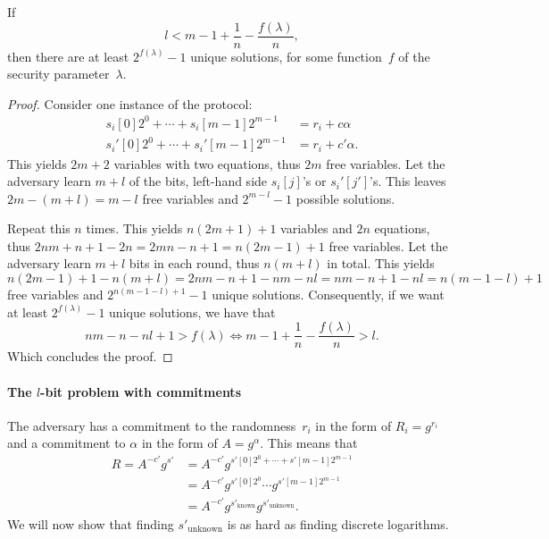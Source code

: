 \begin{lemma}\label{l-bit-advantage}
  If \[l < m-1+\frac{1}{n}-\frac{f(\lambda)}{n},\] then there are at least 
  \(2^{f(\lambda)}-1\) unique solutions, for some function~\(f\) of the 
  security parameter~\(\lambda\).
\end{lemma}
\begin{proof}
  Consider one instance of the protocol:
  \begin{align*}
    s_i[0]2^0 + \dotsb + s_i[m-1]2^{m-1} &= r_i + c\alpha \\
    s_i'[0]2^0 + \dotsb + s_i'[m-1]2^{m-1} &= r_i + c'\alpha.
  \end{align*}
  This yields \(2m+2\) variables with two equations, thus \(2m\) free variables.
  Let the adversary learn \(m+l\) of the bits, \ie left-hand side \(s_i[j]\)'s or 
  \(s_i'[j']\)'s.
  This leaves \(2m-(m+l) = m-l\) free variables and \(2^{m-l}-1\) possible 
  solutions.

  Repeat this \(n\) times.
  This yields \(n(2m+1)+1\) variables and \(2n\) equations, thus \(2nm+n+1-2n = 
  2mn - n +1 = n(2m-1)+1\) free variables.
  Let the adversary learn \(m+l\) bits in each round, thus \(n(m+l)\) in total.
  This yields \(n(2m-1)+1 -n(m+l) = 2nm-n+1-nm-nl = nm-n+1-nl = n(m-1-l)+1\) 
  free variables and \(2^{n(m-1-l)+1}-1\) unique solutions.
  Consequently, if we want at least \(2^{f(\lambda)}-1\) unique solutions, we 
  have that
  \begin{equation*}
    nm-n-nl+1 > f(\lambda) \iff m-1+\frac{1}{n}-\frac{f(\lambda)}{n} > l.
  \end{equation*}
  Which concludes the proof.
\end{proof}

\paragraph*{The \(l\)-bit problem with commitments}

The adversary has a commitment to the randomness~\(r_i\) in the form of \(R_i = 
g^{r_i}\) and a commitment to \(\alpha\) in the form of \(A = g^\alpha\).
This means that
\begin{align*}
  R = A^{-c'} g^{s'} &= A^{-c'} g^{s'[0] 2^0 + \dotsb + s'[m-1] 2^{m-1}} \\
                     &= A^{-c'} g^{s'[0] 2^0} \dotsb g^{s'[m-1] 2^{m-1}} \\
                     &= A^{-c'} g^{s'_{\text{known}}} g^{s'_{\text{unknown}}}.
\end{align*}
We will now show that finding \(s'_\text{unknown}\) is as hard as finding 
discrete logarithms.

